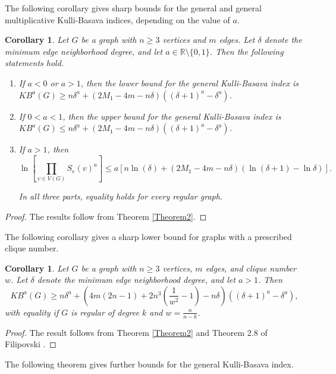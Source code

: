 \documentclass[10pt,a4paper]{amsart}
\newtheorem{cor}[theorem]{Corollary}
\numberwithin{equation}{section}
\begin{document}
The following corollary gives sharp bounds for the general and general multiplicative Kulli-Basava indices, depending on the value of $a$.

\begin{cor}
Let $G$ be a graph with $n\geq 3$ vertices and $m$ edges. Let $\delta$ denote the minimum edge neighborhood degree, and let $a\in\mathbb{R}\setminus\{0,1\}$. Then the following statements hold.

\begin{enumerate}
       
\item If $a < 0$ or $ a > 1$, then the lower bound for the general Kulli-Basava index is $KB^a(G) \geq n\delta^a +  (2M_1 - 4m - n\delta) ((\delta + 1)^a - \delta^a)$.

\item If $0 < a < 1$, then the upper bound for the general Kulli-Basava index is $KB^a(G)  \leq n\delta^a +  (2M_1 - 4m - n\delta) ((\delta + 1)^a - \delta^a)$.

\item If $a>1$, then
\[
\ln\left[\prod_{v\in V(G)}S_e(v)^a\right]\leq a\left[n\ln(\delta)+(2M_1-4m-n\delta)(\ln(\delta+1)-\ln\delta)\right].
\]

   
In all three parts, equality holds for every regular graph.
    
\end{enumerate}
       
\end{cor}
\begin{proof}
The results follow from Theorem \ref{Theorem2}.
\end{proof}


The following corollary gives a sharp lower bound for graphs with a prescribed clique number.

\begin{cor}
Let $G$ be a graph with $n\geq 3$ vertices, $m$ edges, and clique number $w$. Let $\delta$ denote the minimum edge neighborhood degree, and let $a>1$. Then
\[
KB^a(G)\geq n\delta^a+\left(4m(2n-1)+2n^3\left(\frac{1}{w^2}-1\right)-n\delta\right)((\delta+1)^a-\delta^a),
\]
with equality if $G$ is regular of degree $k$ and $w=\frac{n}{n-k}$.
\end{cor}
\begin{proof}
The result follows from Theorem \ref{Theorem2} and Theorem 2.8 of Filipovski \cite{filipovski2021new}.
\end{proof}

The following theorem gives further bounds for the general Kulli-Basava index.
\end{document}

